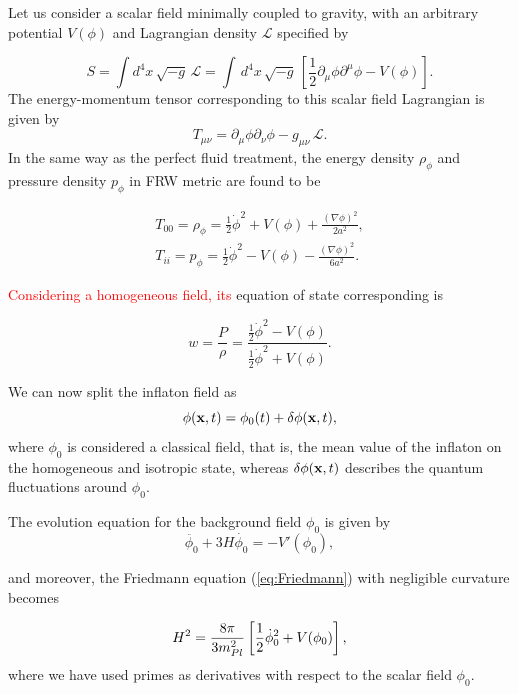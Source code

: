 \documentclass{rmaa}
\def\beq{\begin{equation}}
\def\eeq{\end{equation}}
\begin{document}
Let us consider a scalar field minimally coupled to gravity, with an arbitrary
potential $V(\phi)$ and Lagrangian density $\mathcal{L}$ specified by 


\begin{equation}
S=\int d^4x\, \sqrt{-g}\,\mathcal{L}=\int\, d^4x\, \sqrt{-g}\,
\left[\frac{1}{2}
\partial_{\mu}\phi
\partial^{\mu}\phi -V(\phi)\right].
\end{equation}
%
%
The energy-momentum tensor corresponding to this scalar field Lagrangian is given by
\beq
T_{\mu\nu}=\partial_{\mu}\phi \partial_{\nu}\phi
-g_{\mu\nu}\, \mathcal{L}.
\eeq
%
In the same way as the perfect fluid treatment, the 
energy density $\rho_\phi$ and pressure density $p_\phi$ in FRW metric are found to be 

\begin{eqnarray}
T_{00}=\rho_{\phi}=\frac{1}{2}\dot{\phi}^2 + V(\phi)+ 
\frac{(\nabla \phi)^2}{2a^2},  \\
T_{ii}=p_{\phi}=\frac{1}{2}\dot{\phi}^2 - V(\phi)- \frac{(\nabla
\phi)^2}{6a^2}.
\end{eqnarray}

\noindent
\textcolor{red}{Considering a homogeneous field, its} equation of state corresponding is
 
\begin{equation}
w = \frac{P}{\rho}=\frac{\frac{1}{2}\dot \phi^2-V(\phi)}{\frac{1}{2}\dot \phi^2+V(\phi)}.
\end{equation}

\noindent
We can now split the inflaton field as
\beq \label{eq:split}
\phi({\bf x},t)=\phi_{0}(t)+\delta\phi({\bf x},t),
\eeq
where $\phi_{0}$ is considered a classical field, that is, 
the mean value of the inflaton on the homogeneous and isotropic state, 
whereas $\delta\phi({\bf x},t)$ describes the quantum fluctuations around $\phi_{0}$.

\noindent
The evolution equation for the background field $\phi_0$  is given by
\begin{equation}
\ddot{\phi_0}+ 3H\dot{\phi_0}= -V'(\phi_0),
\label{eq:motion1}
\end{equation}

\noindent
and moreover, the Friedmann equation (\ref{eq:Friedmann}) with negligible curvature becomes

\beq \label{eq:motion2}
H^2 = \frac{8\pi}{3m^2_{Pl}} \left[{1 \over 2} \dot\phi_0^2 +V(\phi_0)\right],
\eeq
where we have used 
primes as derivatives with respect to the scalar field $\phi_0$. 
\\
\end{document}
